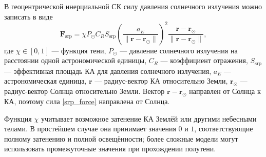 В геоцентрической инерциальной СК силу давления солнечного излучения можно записать в виде
\begin{equation}
    \mathbf F_{\mathrm{srp}}
    =
    \chi
    P_\odot C_R S_{\mathrm{srp}}
    \left(
        \frac{a_E}{\|\mathbf r-\mathbf r_\odot\|}
    \right)^2
    \frac{\mathbf r-\mathbf r_\odot}
    {\|\mathbf r-\mathbf r_\odot\|},
\label{srp_force}
\end{equation}
где $\chi \in [0,1]$ --- функция тени, $P_\odot$ --- давление солнечного излучения на расстоянии одной астрономической единицы, $C_R$ --- коэффициент отражения, $S_{\mathrm{srp}}$ --- эффективная площадь КА для давления солнечного излучения, $a_E$ --- астрономическая единица, $\mathbf r$ --- радиус-вектор КА относительно Земли, $\mathbf r_\odot$ --- радиус-вектор Солнца относительно Земли. Вектор $\mathbf r-\mathbf r_\odot$ направлен от Солнца к КА, поэтому сила \eqref{srp_force} направлена от Солнца.

Функция $\chi$ учитывает возможное затенение КА Землёй или другими небесными телами. В простейшем случае она принимает значения $0$ и $1$, соответствующие полному затенению и полной освещённости; более сложные модели могут использовать промежуточные значения при прохождении полутени.

